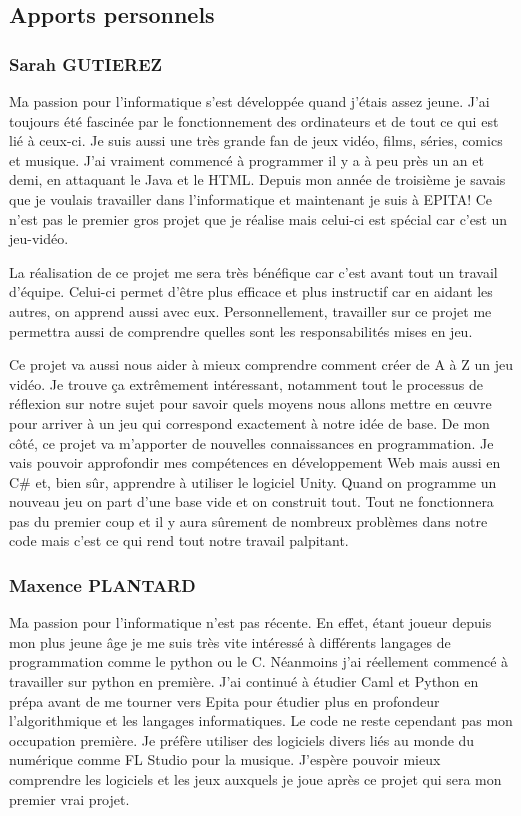 \documentclass[]{extarticle}
\begin{document}
	\subsection{Apports personnels}
		\subsubsection{Sarah GUTIEREZ}
\bigbreak
\bigbreak
Ma passion pour l’informatique s’est développée quand j’étais assez jeune. J’ai toujours été fascinée par le fonctionnement des ordinateurs et de tout ce qui est lié à ceux-ci. Je suis aussi une très grande fan de jeux vidéo, films, séries, comics et musique. J’ai vraiment commencé à programmer il y a à peu près un an et demi, en attaquant le Java et le HTML. Depuis mon année de troisième je savais que je voulais travailler dans l’informatique et maintenant je suis à EPITA! Ce n’est pas le premier gros projet que je réalise mais celui-ci est spécial car c’est un jeu-vidéo.  

La réalisation de ce projet me sera très bénéfique car c’est avant tout un travail d’équipe. Celui-ci permet d’être plus efficace et plus instructif car en aidant les autres, on apprend aussi avec eux. Personnellement, travailler sur ce projet me permettra aussi de comprendre quelles sont les responsabilités mises en jeu.

Ce projet va aussi nous aider à mieux comprendre comment créer de A à Z un jeu vidéo. Je trouve ça extrêmement intéressant, notamment tout le processus de réflexion sur notre sujet pour savoir quels moyens nous allons mettre en œuvre pour arriver à un jeu qui correspond exactement à notre idée de base.
De mon côté, ce projet va m’apporter de nouvelles connaissances en programmation. Je vais pouvoir approfondir mes compétences en développement Web mais aussi en C\# et, bien sûr, apprendre à utiliser le logiciel Unity. Quand on programme un nouveau jeu on part d’une base vide et on construit tout. Tout ne fonctionnera pas du premier coup et il y aura sûrement de nombreux problèmes dans notre code mais c’est ce qui rend tout notre travail palpitant.
\bigbreak
		\subsubsection{Maxence PLANTARD}
\bigbreak
\bigbreak
	Ma passion pour l’informatique n’est pas récente. En effet, étant joueur depuis mon plus jeune âge je me suis très vite intéressé à différents langages de programmation comme le python ou le C. Néanmoins j’ai réellement commencé à travailler sur python en première. J’ai continué à étudier Caml et Python en prépa avant de me tourner vers Epita pour étudier plus en profondeur l’algorithmique et les langages informatiques. Le code ne reste cependant pas mon occupation première. Je préfère utiliser des logiciels divers liés au monde du numérique comme FL Studio pour la musique. J’espère pouvoir mieux comprendre les logiciels et les jeux auxquels je joue après ce projet qui sera mon premier vrai projet.
	
\end{document}
